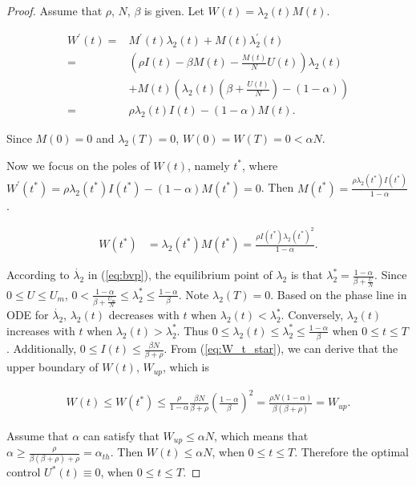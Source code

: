 \begin{proof}
Assume that $\rho$, $N$, $\beta$ is given.
Let $W(t) = \lambda_{2}(t)M(t)$.
\begin{small}
\begin{equation}
\label{eq:W_diff}
\begin{aligned}
W^{'}(t) =& M^{'}(t) \lambda_{2}(t) + M(t) \lambda_{2}^{'}(t)\\
=& (\rho I(t)  - \beta M(t) - \frac{M(t)}{N} U(t) )\lambda_{2}(t) \\
&+ M(t) (\lambda_{2}(t) (\beta + \frac{U(t)}{N} ) - (1-\alpha))\\
=& \rho \lambda_{2}(t) I(t) - (1-\alpha)M(t).
\end{aligned}
\end{equation}
\end{small}
Since $M(0)=0$ and $\lambda_{2}(T)=0$,
$W(0)=W(T)=0<\alpha N$.

Now we focus on the poles of $W(t)$, namely $t^{*}$,
where $W^{'}(t^{*})=\rho \lambda_{2}(t^{*}) I(t^{*}) - (1-\alpha)M(t^{*})=0$.
Then $M(t^{*}) = \frac{\rho \lambda_{2}(t^{*}) I(t^{*})}{1-\alpha}$.
\begin{small}
\begin{equation}
\label{eq:W_t_star}
\begin{aligned}
W(t^{*}) &= \lambda_{2}(t^{*}) M(t^{*}) = \frac{\rho I(t^{*}) \lambda_{2}(t^{*})^2}{1-\alpha}.
\end{aligned}
\end{equation}
\end{small}

According to $\dot{\lambda_{2}}$ in (\ref{eq:bvp}),
the equilibrium point of $\lambda_{2}$ is that $\lambda_{2}^{*} = \frac{1-\alpha}{\beta+\frac{U}{N}}$.
Since $0 \le U \le U_{m}$, $0 < \frac{1-\alpha}{\beta+\frac{U_{m}}{N}} \le \lambda_{2}^{*} \le \frac{1-\alpha}{\beta}$.
Note $\lambda_{2}(T)=0$.
Based on the phase line in ODE for $\dot{\lambda_{2}}$,
$\lambda_{2}(t)$ decreases with $t$ when $\lambda_{2}(t) < \lambda_{2}^{*}$.
Conversely, $\lambda_{2}(t)$ increases with $t$ when $\lambda_{2}(t) > \lambda_{2}^{*}$.
Thus $0 \le \lambda_{2}(t) \le \lambda_{2}^{*} \le \frac{1-\alpha}{\beta}$ when $0 \le t \le T$.
Additionally, $0 \le I(t) \le \frac{\beta N}{\beta + \rho}$.
From (\ref{eq:W_t_star}), we can derive that the upper boundary of $W(t)$, $W_{up}$, which is
\begin{small}
\begin{equation}
\nonumber
\begin{aligned}
W(t) \le W(t^{*}) \le \frac{\rho}{1-\alpha} \frac{\beta N}{\beta + \rho} (\frac{1-\alpha}{\beta})^2 = \frac{\rho N (1-\alpha)}{\beta(\beta+\rho)} = W_{up}.
\end{aligned}
\end{equation}
\end{small}

Assume that $\alpha$ can satisfy that $W_{up} \le \alpha N$,
which means that $\alpha \ge \frac{\rho}{\beta(\beta+\rho)+\rho} = \alpha_{th}$.
Then $W(t) \le \alpha N$, when $0 \le t \le T$.
Therefore the optimal control $U^{*}(t) \equiv 0$, when $0 \le t \le T$.
\end{proof}

